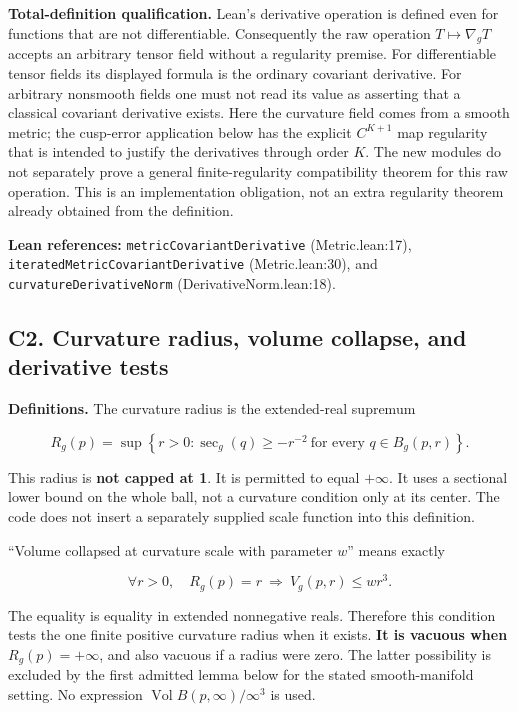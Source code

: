\documentclass[
  letterpaper,
  11pt]{article}
\begin{document}
\textbf{Total-definition qualification.} Lean's derivative operation is
defined even for functions that are not differentiable. Consequently the
raw operation \(T\mapsto\nabla_gT\) accepts an arbitrary tensor field
without a regularity premise. For differentiable tensor fields its
displayed formula is the ordinary covariant derivative. For arbitrary
nonsmooth fields one must not read its value as asserting that a
classical covariant derivative exists. Here the curvature field comes
from a smooth metric; the cusp-error application below has the explicit
\(C^{K+1}\) map regularity that is intended to justify the derivatives
through order \(K\). The new modules do not separately prove a general
finite-regularity compatibility theorem for this raw operation. This is
an implementation obligation, not an extra regularity theorem already
obtained from the definition.

\textbf{Lean references:}
{\small\texttt{metric\allowbreak{}Covariant\allowbreak{}Derivative}}
(Metric.lean:17),
{\small\texttt{iterated\allowbreak{}Metric\allowbreak{}Covariant\allowbreak{}Derivative}}
(Metric.lean:30), and
{\small\texttt{curvature\allowbreak{}Derivative\allowbreak{}Norm}}
(DerivativeNorm.lean:18).

\subsection{C2. Curvature radius, volume collapse, and derivative
tests}\label{collapse-radius}

\textbf{Definitions.} The curvature radius is the extended-real supremum

\[
 R_g(p)=\sup\left\{r>0:\sec_g(q)\geq-r^{-2}\ \text{for every }q\in B_g(p,r)\right\}.
\]

This radius is \textbf{not capped at 1}. It is permitted to equal
\(+\infty\). It uses a sectional lower bound on the whole ball, not a
curvature condition only at its center. The code does not insert a
separately supplied scale function into this definition.

``Volume collapsed at curvature scale with parameter \(w\)'' means
exactly

\[
 \forall r>0,\quad R_g(p)=r\ \Longrightarrow\ V_g(p,r)\leq wr^3.
\]

The equality is equality in extended nonnegative reals. Therefore this
condition tests the one finite positive curvature radius when it exists.
\textbf{It is vacuous when \(R_g(p)=+\infty\)}, and also vacuous if a
radius were zero. The latter possibility is excluded by the first
admitted lemma below for the stated smooth-manifold setting. No
expression \(\operatorname{Vol}B(p,\infty)/\infty^3\) is used.
\end{document}
